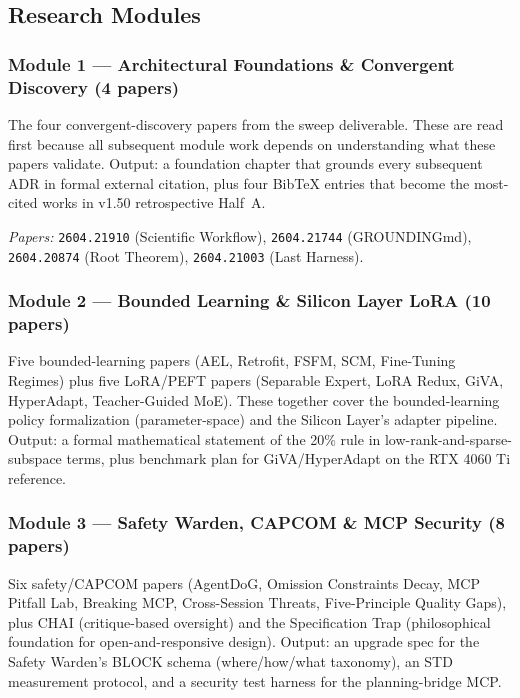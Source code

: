 \documentclass[11pt,letterpaper]{article}
\newcommand{\arxivid}[1]{\texttt{\textcolor{accent}{#1}}}
\begin{document}
\subsection{Research Modules}

\subsubsection{Module 1 --- Architectural Foundations \& Convergent Discovery (4 papers)}

The four convergent-discovery papers from the sweep deliverable. These are read first because all subsequent module work depends on understanding what these papers validate. Output: a foundation chapter that grounds every subsequent ADR in formal external citation, plus four BibTeX entries that become the most-cited works in v1.50 retrospective Half~A.

\textit{Papers:} \arxivid{2604.21910} (Scientific Workflow), \arxivid{2604.21744} (GROUNDINGmd), \arxivid{2604.20874} (Root Theorem), \arxivid{2604.21003} (Last Harness).

\subsubsection{Module 2 --- Bounded Learning \& Silicon Layer LoRA (10 papers)}

Five bounded-learning papers (AEL, Retrofit, FSFM, SCM, Fine-Tuning Regimes) plus five LoRA/PEFT papers (Separable Expert, LoRA Redux, GiVA, HyperAdapt, Teacher-Guided MoE). These together cover the bounded-learning policy formalization (parameter-space) and the Silicon Layer's adapter pipeline. Output: a formal mathematical statement of the 20\% rule in low-rank-and-sparse-subspace terms, plus benchmark plan for GiVA/HyperAdapt on the RTX 4060 Ti reference.

\subsubsection{Module 3 --- Safety Warden, CAPCOM \& MCP Security (8 papers)}

Six safety/CAPCOM papers (AgentDoG, Omission Constraints Decay, MCP Pitfall Lab, Breaking MCP, Cross-Session Threats, Five-Principle Quality Gaps), plus CHAI (critique-based oversight) and the Specification Trap (philosophical foundation for open-and-responsive design). Output: an upgrade spec for the Safety Warden's BLOCK schema (where/how/what taxonomy), an STD measurement protocol, and a security test harness for the planning-bridge MCP.
\end{document}
